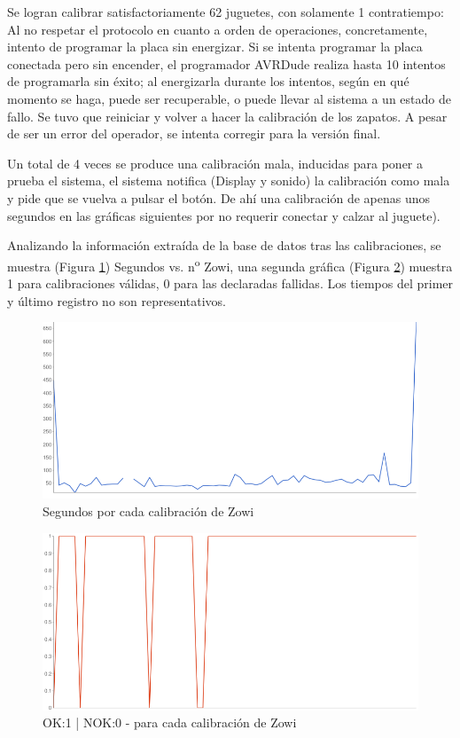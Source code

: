 Se logran calibrar satisfactoriamente 62 juguetes, con solamente 1 contratiempo: Al no respetar el protocolo en cuanto a orden de operaciones, concretamente, intento de programar la placa sin energizar. Si se intenta programar la placa conectada pero sin encender, el programador AVRDude realiza hasta 10 intentos de programarla sin éxito; al energizarla durante los intentos, según en qué momento se haga, puede ser recuperable, o puede llevar al sistema a un estado de fallo. Se tuvo que reiniciar y volver a hacer la calibración de los zapatos. A pesar de ser un error del operador, se intenta corregir para la versión final.

Un total de 4 veces se produce una calibración mala, inducidas para poner a prueba el sistema, el sistema notifica (Display y sonido) la calibración como mala y pide que se vuelva a pulsar el botón. De ahí una calibración de apenas unos segundos en las gráficas siguientes por no requerir conectar y calzar al juguete).

Analizando la información extraída de la base de datos tras las calibraciones, se muestra (Figura \ref{fig:tiempos}) Segundos vs. n\textsuperscript{o} Zowi, una segunda gráfica (Figura \ref{fig:ok-nok}) muestra 1 para calibraciones válidas, 0 para las declaradas fallidas. Los tiempos del primer y último registro no son representativos.

\begin{figure}
\centering
\includegraphics[width=140mm]{Figures/tiempos}
\caption{Segundos por cada calibración de Zowi}
\label{fig:tiempos}
\end{figure}

\begin{figure}
\centering
\includegraphics[width=140mm]{Figures/ok-nok}
\caption{OK:1 | NOK:0 - para cada calibración de Zowi}
\label{fig:ok-nok}
\end{figure}

